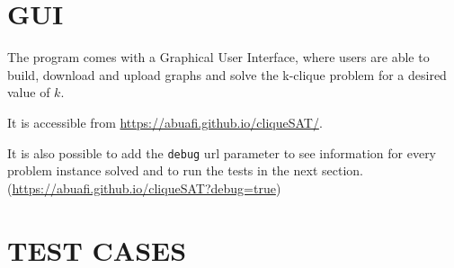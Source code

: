 \documentclass[table]{article}
\begin{document}
\section{GUI}
The program comes with a Graphical User Interface, where users are able to build, download and upload graphs and solve the k-clique problem for a desired value of $k$.

It is accessible from \url{https://abuafi.github.io/cliqueSAT/}.

It is also possible to add the \lstinline{debug} url parameter to see information for every problem instance solved and to run the tests in the next section. (\url{https://abuafi.github.io/cliqueSAT?debug=true})

\section{TEST CASES}
\end{document}
